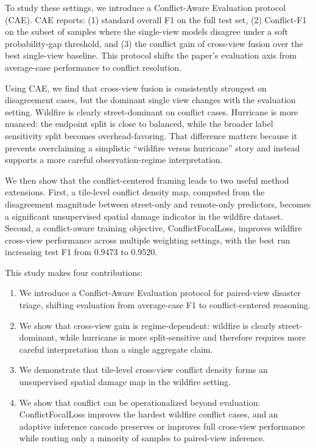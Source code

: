 \documentclass[sigconf]{acmart}
\begin{document}
To study these settings, we introduce a Conflict-Aware Evaluation protocol
(CAE). CAE reports: (1) standard overall F1 on the full test set, (2)
Conflict-F1 on the subset of samples where the single-view models disagree
under a soft probability-gap threshold, and (3) the conflict gain of cross-view
fusion over the best single-view baseline. This protocol shifts the paper's
evaluation axis from average-case performance to conflict resolution.

Using CAE, we find that cross-view fusion is consistently strongest on
disagreement cases, but the dominant single view changes with the evaluation
setting. Wildfire is clearly street-dominant on conflict cases. Hurricane is
more nuanced: the endpoint split is close to balanced, while the broader label
sensitivity split becomes overhead-favoring. That difference matters because it
prevents overclaiming a simplistic ``wildfire versus hurricane'' story and
instead supports a more careful observation-regime interpretation.

We then show that the conflict-centered framing leads to two useful method
extensions. First, a tile-level conflict density map, computed from the
disagreement magnitude between street-only and remote-only predictors, becomes
a significant unsupervised spatial damage indicator in the wildfire dataset.
Second, a conflict-aware training objective, ConflictFocalLoss, improves
wildfire cross-view performance across multiple weighting settings, with the
best run increasing test F1 from 0.9473 to 0.9520.

This study makes four contributions:
\begin{enumerate}
  \item We introduce a Conflict-Aware Evaluation protocol for paired-view
  disaster triage, shifting evaluation from average-case F1 to conflict-centered
  reasoning.
  \item We show that cross-view gain is regime-dependent: wildfire is clearly
  street-dominant, while hurricane is more split-sensitive and therefore
  requires more careful interpretation than a single aggregate claim.
  \item We demonstrate that tile-level cross-view conflict density forms an
  unsupervised spatial damage map in the wildfire setting.
  \item We show that conflict can be operationalized beyond evaluation:
  ConflictFocalLoss improves the hardest wildfire conflict cases, and an
  adaptive inference cascade preserves or improves full cross-view performance
  while routing only a minority of samples to paired-view inference.
\end{enumerate}
\end{document}
